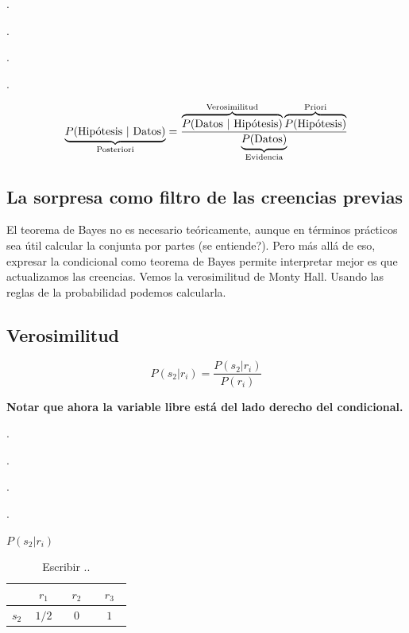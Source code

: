 \documentclass[a4paper,10pt]{book}
\begin{document}
\vspace{0.3cm}


.

.

.

.

\begin{equation*}
\underbrace{P(\text{Hip\'otesis }|\text{ Datos})}_{\text{\scriptsize Posteriori}} = \frac{\overbrace{P(\text{Datos }|\text{ Hip\'otesis})}^{\text{\scriptsize Verosimilitud}} \overbrace{P(\text{Hip\'otesis})}^{\text{\scriptsize Priori}} }{\underbrace{P(\text{Datos})}_{\text{\scriptsize Evidencia}}}
\end{equation*}




\subsection{La sorpresa como filtro de las creencias previas}

El teorema de Bayes no es necesario teóricamente, aunque en términos prácticos sea útil calcular la conjunta por partes (se entiende?).
Pero más allá de eso, expresar la condicional como teorema de Bayes permite interpretar mejor es que actualizamos las creencias.
Vemos la verosimilitud de Monty Hall.
Usando las reglas de la probabilidad podemos calcularla.

\subsection{Verosimilitud}

\begin{equation}
 P(s_2|r_i) = \frac{P(s_2|r_i)}{P(r_i)}
\end{equation}

\textbf{Notar que ahora la variable libre está del lado derecho del condicional.}


.

.

.

.


\begin{table}[H]
 \centering
$P(s_2|r_i)$ \\ \vspace{0.1cm} 
  \begin{tabular}{c|c|c|c} \setlength\tabcolsep{0.4cm} 
          & \, $r_1$ \, &  \, $r_2$ \, & \, $r_3$ \, \\ \hline 
   $s_2$ & $1/2$ & $0$ & $1$  \\ \hline
\end{tabular}
\caption{Escribir .. }
\label{tab:monty_hall_verosimilitud}
\end{table}
\end{document}
